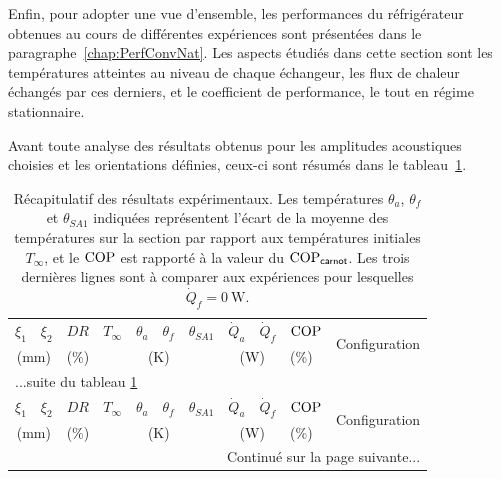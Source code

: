 Enfin, pour adopter une vue d'ensemble, les performances du réfrigérateur obtenues au cours de différentes expériences sont présentées dans le paragraphe~\ref{chap:PerfConvNat}. Les aspects étudiés dans cette section sont les températures atteintes au niveau de chaque échangeur, les flux de chaleur échangés par ces derniers, et le coefficient de performance, le tout en régime stationnaire.\smallskip


Avant toute analyse des résultats obtenus pour les amplitudes acoustiques choisies et les orientations définies, ceux-ci sont résumés dans le tableau~\ref{tab:RecapResultExpe}.

\begin{longtable}{llll llll lll}
	\caption{Récapitulatif des résultats expérimentaux. Les températures $\theta_a$, $\theta_f$ et $\theta_{SA1}$ indiquées représentent l'écart de la moyenne des températures sur la section par rapport aux températures initiales $T_\infty$, et le $\mathrm{COP}$ est rapporté à la valeur du $\mathrm{COP}_{\mathsf{carnot}}$. Les trois dernières lignes sont à comparer aux expériences pour lesquelles $\dot Q_{f}=\qty{0}{\watt}$.}
	\label{tab:RecapResultExpe}\\%
	
	\hline
	$\xi_1$ & $\xi_2$ & $DR$ & $T_\infty$ & $\theta_a$  & $\theta_f$ & $\theta_{SA1}$ & $\dot Q_a$ & $\dot Q_f$ & $\mathrm{COP}$ & \multirow{2}{*}{Configuration} \\%
	
	\multicolumn{2}{c}{(\unit{\milli\meter})} & (\unit{\percent})  & \multicolumn{4}{c}{(\unit{\kelvin})} &\multicolumn{2}{c}{(\unit{\watt})} & (\unit{\percent}) & \\\hline\hline \endfirsthead
	
	\multicolumn{11}{l}{...suite du tableau \ref{tab:RecapResultExpe}}\\\hline
	$\xi_1$ & $\xi_2$  & $DR$ & $T_\infty$ & $\theta_a$  & $\theta_f$ & $\theta_{SA1}$ & $\dot Q_a$ & $\dot Q_f$ & $\mathrm{COP}$ & \multirow{2}{*}{Configuration} \\%
	
	\multicolumn{2}{c}{(\unit{\milli\meter})} & (\unit{\percent}) &  \multicolumn{4}{c}{(\unit{\kelvin})} &\multicolumn{2}{c}{(\unit{\watt})} & (\unit{\percent}) & \\\hline\hline \endhead
	
	\hline
	\multicolumn{11}{r}{Continué sur la page suivante...} \endfoot
    \hline \endlastfoot
	

\end{longtable}

